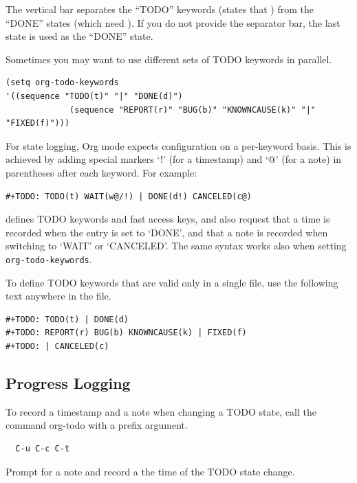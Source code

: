The vertical bar separates the ``TODO'' keywords (states that ) from the ``DONE'' states (which need ). If you do not provide the separator bar, the last state is used as the ``DONE'' state.

Sometimes you may want to use different sets of TODO keywords in parallel.
\begin{tcolorbox}
\begin{verbatim}
(setq org-todo-keywords
'((sequence "TODO(t)" "|" "DONE(d)")
             (sequence "REPORT(r)" "BUG(b)" "KNOWNCAUSE(k)" "|" "FIXED(f)")))
\end{verbatim}
\end{tcolorbox}

For state logging, Org mode expects configuration on a per-keyword basis. This is achieved by adding special markers ‘!’ (for a timestamp) and ‘@’ (for a note) in parentheses after each keyword. For example:
\begin{tcolorbox}
\begin{verbatim}
#+TODO: TODO(t) WAIT(w@/!) | DONE(d!) CANCELED(c@)
\end{verbatim}
\end{tcolorbox}
defines TODO keywords and fast access keys, and also request that a time is recorded when the entry is set to ‘DONE’, and that a note is recorded when switching to ‘WAIT’ or ‘CANCELED’. The same syntax works also when setting \verb|org-todo-keywords|.

To define TODO keywords that are valid only in a single file, use the following text anywhere in the file.
\begin{tcolorbox}
\begin{verbatim}
#+TODO: TODO(t) | DONE(d)
#+TODO: REPORT(r) BUG(b) KNOWNCAUSE(k) | FIXED(f)
#+TODO: | CANCELED(c)
\end{verbatim}
\end{tcolorbox}


\subsection{Progress Logging}
To record a timestamp and a note when changing a TODO state, call the command org-todo with a prefix argument.
\begin{tcolorbox}
\begin{verbatim}
  C-u C-c C-t
\end{verbatim}
Prompt for a note and record a the time of the TODO state change. 
\end{tcolorbox}


